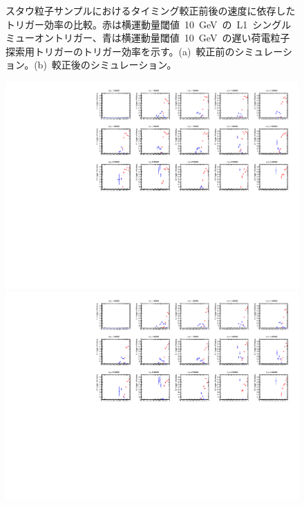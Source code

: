 \begin{figure}[tbp]
\begin{minipage}{0.49\hsize}
    \subcaption{}
    \end{minipage}
    \caption[スタウ粒子サンプルにおけるタイミング較正前後の速度に依存したトリガー効率の比較]{スタウ粒子サンプルにおけるタイミング較正前後の速度に依存したトリガー効率の比較。赤は横運動量閾値~10~GeV~の~L1~シングルミューオントリガー、青は横運動量閾値~10~GeV~の遅い荷電粒子探索用トリガーのトリガー効率を示す。(a)~較正前のシミュレーション。(b)~較正後のシミュレーション。}\label{fig:tribeta}
\end{figure}
\begin{figure}[tbp]
    \begin{minipage}{0.49\hsize}
    \centering   
    \includegraphics[width=\textwidth,page=4]{img/rec/stau_600_ori.pdf}
    \end{minipage}
    \begin{minipage}{0.49\hsize}
    \centering   
    \includegraphics[width=\textwidth,page=4]{img/rec/stau_600.pdf}

\end{minipage}
\end{figure}
